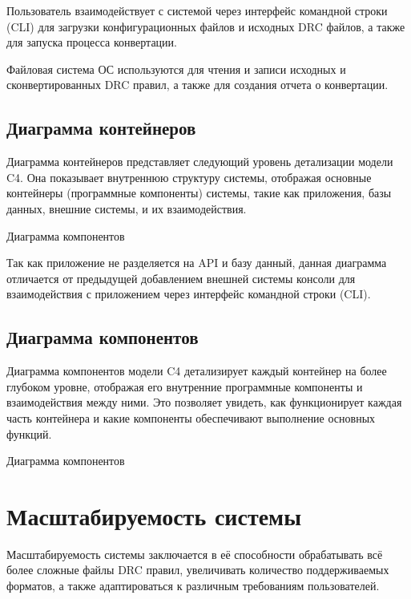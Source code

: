 Пользователь взаимодействует с системой через интерфейс командной строки (CLI)
для загрузки конфигурационных файлов и исходных DRC файлов,
а также для запуска процесса конвертации.\par
Файловая система ОС используются для чтения и записи исходных
и сконвертированных DRC правил, а также для создания отчета о конвертации.

\subsection{Диаграмма контейнеров}

Диаграмма контейнеров представляет следующий уровень детализации модели C4.
Она показывает внутреннюю структуру системы,
отображая основные контейнеры (программные компоненты) системы,
такие как приложения, базы данных, внешние системы, и их взаимодействия.
   
\begin{image}
	\caption{Диаграмма компонентов}
	\label{fig:c4:container}
\end{image}

Так как приложение не разделяется на API и базу данный,
данная диаграмма отличается от предыдущей добавлением внешней системы
консоли для взаимодействия с приложением
через интерфейс командной строки (CLI).

\subsection{Диаграмма компонентов}

Диаграмма компонентов модели C4 детализирует
каждый контейнер на более глубоком уровне,
отображая его внутренние программные компоненты и взаимодействия между ними.
Это позволяет увидеть, как функционирует каждая часть контейнера
и какие компоненты обеспечивают выполнение основных функций.

\begin{image}
	\caption{Диаграмма компонентов}
	\label{fig:c4:components}
\end{image}

\section{Масштабируемость системы}

Масштабируемость системы заключается в её способности обрабатывать
всё более сложные файлы DRC правил,
увеличивать количество поддерживаемых форматов,
а также адаптироваться к различным требованиям пользователей.

